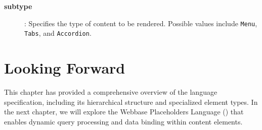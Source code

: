 \begin{description}
\item[\textbf{subtype}]: Specifies the type of content to be rendered. Possible values include \texttt{Menu}, \texttt{Tabs}, and \texttt{Accordion}.
\end{description}

\section{Looking Forward}
\label{sec:wbdl-forward}

This chapter has provided a comprehensive overview of the \wbdl{} language specification, including its hierarchical structure and specialized element types. In the next chapter, we will explore the Webbase Placeholders Language (\wbpl{}) that enables dynamic query processing and data binding within \wbdl{} content elements.
